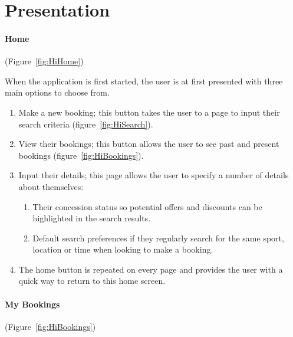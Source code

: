 \section{Presentation}
\label{sec:secondprotopresentation}

\paragraph{Home} (Figure~\ref{fig:HiHome})


When the application is first started, the user is at first presented with
three main options to choose from.
\begin{enumerate}
	\item Make a new booking; this button takes the user to a page to input
		their search criteria (figure~\ref{fig:HiSearch}).
	\item View their bookings; this button allows the user to see past and
		present bookings (figure~\ref{fig:HiBookings}).
	\item Input their details; this page allows the user to specify a number
		of details about themselves:

		\begin{enumerate}
			\item Their concession status so potential offers and
				discounts can be highlighted in the search results.
			\item Default search preferences if they regularly search for the
				same sport, location or time when looking to make a booking.
		\end{enumerate}
	\item The home button is repeated on every page and provides the user with
		a quick way to return to this home screen.
\end{enumerate}

\paragraph{My Bookings} (Figure~\ref{fig:HiBookings})


